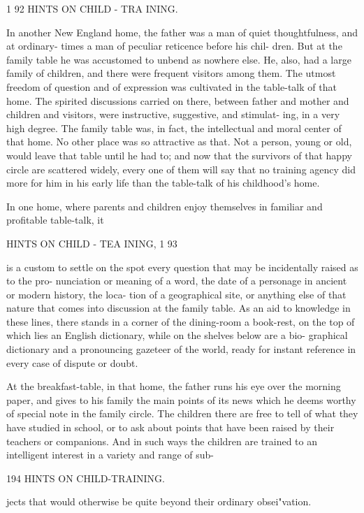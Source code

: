 \documentclass[
]{book}
\begin{document}
1 92 HINTS ON CHILD - TRA INING.

In another New England home, the father was a man of quiet thoughtfulness, and at ordinary- times a man of peculiar reticence before his chil- dren. But at the family table he was accustomed to unbend as nowhere else. He, also, had a large family of children, and there were frequent visitors among them. The utmost freedom of question and of expression was cultivated in the table-talk of that home. The spirited discussions carried on there, between father and mother and children and visitors, were instructive, suggestive, and stimulat- ing, in a very high degree. The family table was, in fact, the intellectual and moral center of that home. No other place was so attractive as that. Not a person, young or old, would leave that table until he had to; and now that the survivors of that happy circle are scattered widely, every one of them will say that no training agency did more for him in his early life than the table-talk of his childhood's home.

In one home, where parents and children enjoy themselves in familiar and profitable table-talk, it

HINTS ON CHILD - TEA INING, 1 93

is a custom to settle on the spot every question that may be incidentally raised as to the pro- nunciation or meaning of a word, the date of a personage in ancient or modern history, the loca- tion of a geographical site, or anything else of that nature that comes into discussion at the family table. As an aid to knowledge in these lines, there stands in a corner of the dining-room a book-rest, on the top of which lies an English dictionary, while on the shelves below are a bio- graphical dictionary and a pronouncing gazeteer of the world, ready for instant reference in every case of dispute or doubt.

At the breakfast-table, in that home, the father runs his eye over the morning paper, and gives to his family the main points of its news which he deems worthy of special note in the family circle. The children there are free to tell of what they have studied in school, or to ask about points that have been raised by their teachers or companions. And in such ways the children are trained to an intelligent interest in a variety and range of sub-

194 HINTS ON CHILD-TRAINING.

jects that would otherwise be quite beyond their ordinary obsei"vation.
\end{document}
